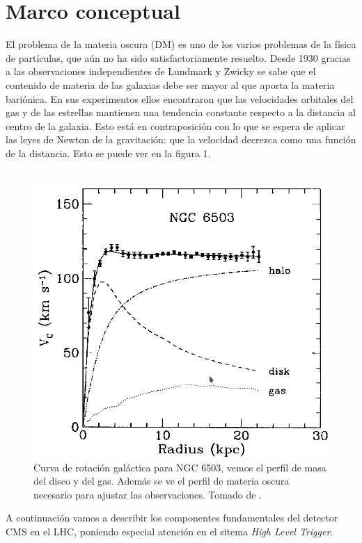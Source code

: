 \section{Marco conceptual}
El problema de la materia oscura (DM) es uno de los varios problemas de la física de partículas, que aún no ha sido satisfactoriamente resuelto. Desde 1930 gracias a las observaciones independientes de Lundmark y Zwicky \cite{ARTICLE:1,ARTICLE:2} se sabe que el contenido de materia de las galaxias debe ser mayor al que aporta la materia bariónica. En sus experimentos ellos encontraron que las velocidades orbitales del gas y de las estrellas mantienen una tendencia constante respecto a la distancia al centro de la galaxia.
 Esto está en contraposición con lo que se espera de aplicar las leyes de Newton de la gravitación: que la velocidad decrezca como una función de la distancia. Esto se puede ver en la figura 1.
\\
\\
\begin{figure}
\centering
\includegraphics[width=12cm]{F1.png}
\caption{\label{fig:frog} Curva de rotación galáctica para NGC 6503, vemos el perfil de masa del disco y del gas. Además se ve el perfil de materia oscura necesario para ajustar las observaciones. Tomado de \cite{Freese:2017idy}.}
\end{figure}
A continuación vamos a describir los componentes fundamentales del detector CMS en el LHC, poniendo especial atención en el sitema \textit{High Level Trigger}.


